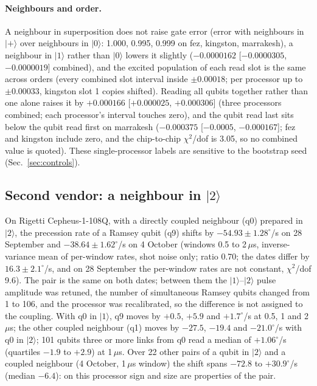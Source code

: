 \documentclass[reprint,amsmath,amssymb,aps,superscriptaddress,nofootinbib]{revtex4-2}
\newcommand{\us}{\,$\mu$s}
\begin{document}
\paragraph*{Neighbours and order.} A neighbour in superposition does not raise gate error (error with neighbours in $|+\rangle$ over neighbours in $|0\rangle$: 1.000, 0.995, 0.999 on fez, kingston, marrakesh), a neighbour in $|1\rangle$ rather than $|0\rangle$ lowers it slightly ($-0.0000162$ [$-0.0000305$, $-0.0000019$] combined), and the excited population of each read slot is the same across orders (every combined slot interval inside $\pm0.00018$; per processor up to $\pm0.00033$, kingston slot 1 copies shifted). Reading all qubits together rather than one alone raises it by $+0.000166$ [$+0.000025$, $+0.000306$] (three processors combined; each processor's interval touches zero), and the qubit read last sits below the qubit read first on marrakesh ($-0.000375$ [$-0.0005$, $-0.000167$]; fez and kingston include zero, and the chip-to-chip $\chi^2$/dof is 3.05, so no combined value is quoted). These single-processor labels are sensitive to the bootstrap seed (Sec.~\ref{sec:controls}).

\subsection{Second vendor: a neighbour in $|2\rangle$}\label{sec:rigetti}

On Rigetti Cepheus-1-108Q, with a directly coupled neighbour (q0) prepared in $|2\rangle$, the precession rate of a Ramsey qubit (q9) shifts by $-54.93\pm1.28^\circ$/\textmu s on 28 September and $-38.64\pm1.62^\circ$/\textmu s on 4 October (windows 0.5 to 2\us, inverse-variance mean of per-window rates, shot noise only; ratio 0.70; the dates differ by $16.3\pm2.1^\circ$/\textmu s, and on 28 September the per-window rates are not constant, $\chi^2$/dof 9.6). The pair is the same on both dates; between them the $|1\rangle$--$|2\rangle$ pulse amplitude was retuned, the number of simultaneous Ramsey qubits changed from 1 to 106, and the processor was recalibrated, so the difference is not assigned to the coupling. With q0 in $|1\rangle$, q9 moves by $+0.5$, $+5.9$ and $+1.7^\circ$/\textmu s at 0.5, 1 and 2\us; the other coupled neighbour (q1) moves by $-27.5$, $-19.4$ and $-21.0^\circ$/\textmu s with q0 in $|2\rangle$; 101 qubits three or more links from q0 read a median of $+1.06^\circ$/\textmu s (quartiles $-1.9$ to $+2.9$) at 1\us. Over 22 other pairs of a qubit in $|2\rangle$ and a coupled neighbour (4 October, 1\us{} window) the shift spans $-72.8$ to $+30.9^\circ$/\textmu s (median $-6.4$): on this processor sign and size are properties of the pair.
\end{document}
